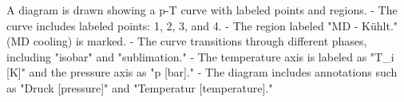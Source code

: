 A diagram is drawn showing a p-T curve with labeled points and regions.  
- The curve includes labeled points: 1, 2, 3, and 4.  
- The region labeled "MD - Kühlt." (MD cooling) is marked.  
- The curve transitions through different phases, including "isobar" and "sublimation."  
- The temperature axis is labeled as "T_i [K]" and the pressure axis as "p [bar]."  
- The diagram includes annotations such as "Druck [pressure]" and "Temperatur [temperature]."